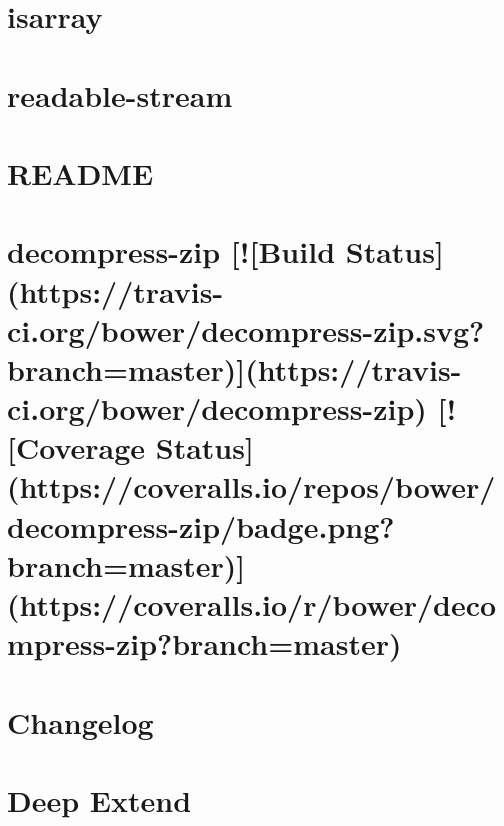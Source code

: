 \documentclass[twoside]{book}
\newcommand{\+}{\discretionary{\mbox{\scriptsize$\hookleftarrow$}}{}{}}
\begin{document}
\chapter{isarray}
\label{md_dsmacc_examples_DRmerge_node_modules_decompress-zip_node_modules_isarray_README}

\chapter{readable-\/stream}
\label{md_dsmacc_examples_DRmerge_node_modules_decompress-zip_node_modules_readable-stream_README}

\chapter{R\+E\+A\+D\+ME}
\label{md_dsmacc_examples_DRmerge_node_modules_decompress-zip_node_modules_string_decoder_README}

\chapter{decompress-\/zip \mbox{[}!\mbox{[}Build Status\mbox{]}(https\+://travis-\/ci.org/bower/decompress-\/zip.svg?branch=master)\mbox{]}(https\+://travis-\/ci.org/bower/decompress-\/zip) \mbox{[}!\mbox{[}Coverage Status\mbox{]}(https\+://coveralls.io/repos/bower/decompress-\/zip/badge.png?branch=master)\mbox{]}(https\+://coveralls.io/r/bower/decompress-\/zip?branch=master)}
\label{md_dsmacc_examples_DRmerge_node_modules_decompress-zip_README}

\chapter{Changelog}
\label{md_dsmacc_examples_DRmerge_node_modules_deep-extend_CHANGELOG}

\chapter{Deep Extend}
\label{md_dsmacc_examples_DRmerge_node_modules_deep-extend_README}

\end{document}
